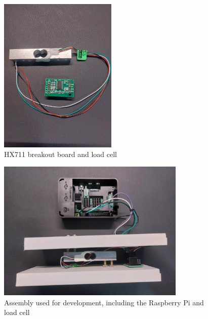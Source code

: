 \documentclass[openright]{normas-utf-tex} %
\begin{document}
\begin{figure}[H]
	\centering
	\includegraphics[width=0.5\textwidth]{./images/hx711.jpeg}
	\caption[HX711 breakout board and load cell]{HX711 breakout board and load cell}
	\label{fig:dummy}
\end{figure}

\begin{figure}[H]
	\centering
	\includegraphics[width=0.8\textwidth]{./images/raspberrypiwithloadcell.jpeg}
	\caption[Assembly used for development, including the Raspberry Pi and load cell]{Assembly used for development, including the Raspberry Pi and load cell}
	\label{fig:dummy}
\end{figure}
\end{document}
